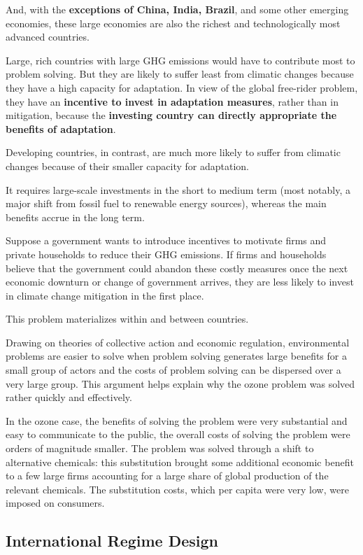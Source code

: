 And, with the \textbf{exceptions of China, India, Brazil}, and some other emerging economies, these large economies are also the richest and technologically most advanced countries.

Large, rich countries with large GHG emissions would have to contribute most to problem solving. But they are likely to suffer least from climatic changes because they have a high capacity for adaptation. In view of the global free-rider problem, they have an \textbf{incentive to invest in adaptation measures}, rather than in mitigation, because the \textbf{investing country can directly appropriate the benefits of adaptation}.

Developing countries, in contrast, are much more likely to suffer from climatic changes because of their smaller capacity for adaptation.

It requires large-scale investments in the short to medium term (most notably, a major shift from fossil fuel to renewable energy sources), whereas the main benefits accrue in the long term.

Suppose a government wants to introduce incentives to motivate firms and private households to reduce their GHG emissions. If firms and households believe that the government could abandon these costly measures once the next economic downturn or change of government arrives, they are less likely to invest in climate change mitigation in the first place.

This problem materializes within and between countries.

Drawing on theories of collective action and economic regulation, environmental problems are easier to solve when problem solving generates large benefits for a small group of actors and the costs of problem solving can be dispersed over a very large group. This argument helps explain why the ozone problem was solved rather quickly and effectively.

In the ozone case, the benefits of solving the problem were very substantial and easy to communicate to the public, the overall costs of solving the problem were orders of magnitude smaller. The problem was solved through a shift to alternative chemicals: this substitution brought some additional economic benefit to a few large firms accounting for a large share of global production of the relevant chemicals. The substitution costs, which per capita were very low, were imposed on consumers.

\subsection{International Regime Design}

